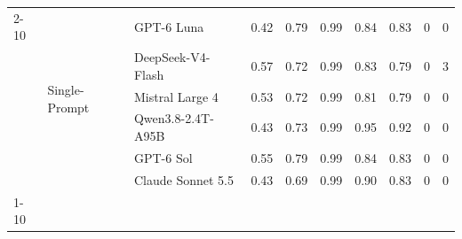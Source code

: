 \begin{tabular}{lllrrrrrrr}
\cline{2-10}
 & \multirow[t]{6}{*}{Single-Prompt} & GPT-6 Luna & 0.42 & 0.79 & 0.99 & 0.84 & 0.83 & 0 & 0 \\
 &  & DeepSeek-V4-Flash & 0.57 & 0.72 & 0.99 & 0.83 & 0.79 & 0 & 3 \\
 &  & Mistral Large 4 & 0.53 & 0.72 & 0.99 & 0.81 & 0.79 & 0 & 0 \\
 &  & Qwen3.8-2.4T-A95B & 0.43 & 0.73 & 0.99 & 0.95 & 0.92 & 0 & 0 \\
 &  & GPT-6 Sol & 0.55 & 0.79 & 0.99 & 0.84 & 0.83 & 0 & 0 \\
 &  & Claude Sonnet 5.5 & 0.43 & 0.69 & 0.99 & 0.90 & 0.83 & 0 & 0 \\
\cline{1-10} \cline{2-10}
\bottomrule
\end{tabular}
